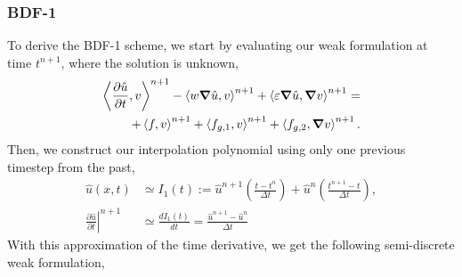 \documentclass[../../thesis.tex]{subfiles}
\newcommand{\inner}[2]{\left<#1, #2\right>}
\newcommand{\dt}{\ensuremath{\Delta t}}
\begin{document}
\subsubsection{BDF-1}
To derive the BDF-1 scheme, we start by evaluating our weak formulation at time $t^{n+1}$, where the solution is unknown,
\begin{equation}
    \begin{split}
        \inner{\frac{\partial \hat{u}}{\partial t}}{v}^{n+1} 
        - \inner{w \grad \hat{u}}{v}^{n+1} 
        + \inner{\varepsilon \grad \hat{u}}{\grad v}^{n+1} =  \\
        + \inner{f}{v}^{n+1} + \inner{f_{g,1}}{v}^{n+1} + \inner{f_{g,2}}{\grad v}^{n+1}.
    \end{split}
\end{equation}
Then, we construct our interpolation polynomial using only one previous timestep from the past, 
\begin{align}
    \hat{u}(x,t) &\simeq I_1(t) := 
    \hat{u}^{n+1}\left( \frac{t-t^{n}}{\dt}  \right)
    + \hat{u}^{n}\left(\frac{t^{n+1}-t}{\dt}\right), \\
    \left.\frac{\partial\hat{u}}{\partial t}\right|^{n+1} &\simeq \frac{d I_1(t)}{dt} = \frac{\hat{u}^{n+1} - \hat{u}^{n}}{\dt}
\end{align}
With this approximation of the time derivative, we get the following semi-discrete weak formulation, 
\end{document}
